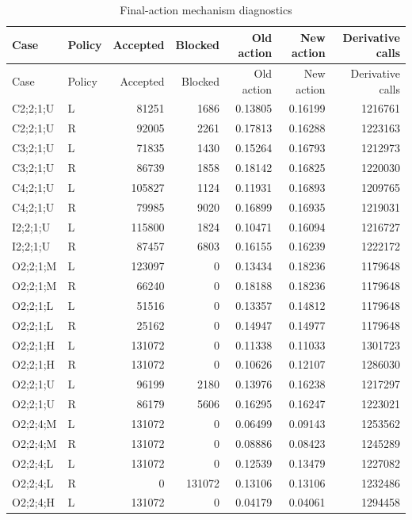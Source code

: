 {\small
\setlength{\tabcolsep}{3pt}
\begin{longtable}{@{}llrrrrr@{}}
\caption{Final-action mechanism diagnostics}\label{tab:mechanism50}\\
\toprule
Case & Policy & Accepted & Blocked & Old action & New action & Derivative calls \\
\midrule
\endfirsthead
\toprule
Case & Policy & Accepted & Blocked & Old action & New action & Derivative calls \\
\midrule
\endhead
\bottomrule
\endfoot
C2;2;1;U & L & 81251 & 1686 & 0.13805 & 0.16199 & 1216761 \\
C2;2;1;U & R & 92005 & 2261 & 0.17813 & 0.16288 & 1223163 \\
C3;2;1;U & L & 71835 & 1430 & 0.15264 & 0.16793 & 1212973 \\
C3;2;1;U & R & 86739 & 1858 & 0.18142 & 0.16825 & 1220030 \\
C4;2;1;U & L & 105827 & 1124 & 0.11931 & 0.16893 & 1209765 \\
C4;2;1;U & R & 79985 & 9020 & 0.16899 & 0.16935 & 1219031 \\
I2;2;1;U & L & 115800 & 1824 & 0.10471 & 0.16094 & 1216727 \\
I2;2;1;U & R & 87457 & 6803 & 0.16155 & 0.16239 & 1222172 \\
O2;2;1;M & L & 123097 & 0 & 0.13434 & 0.18236 & 1179648 \\
O2;2;1;M & R & 66240 & 0 & 0.18188 & 0.18236 & 1179648 \\
O2;2;1;L & L & 51516 & 0 & 0.13357 & 0.14812 & 1179648 \\
O2;2;1;L & R & 25162 & 0 & 0.14947 & 0.14977 & 1179648 \\
O2;2;1;H & L & 131072 & 0 & 0.11338 & 0.11033 & 1301723 \\
O2;2;1;H & R & 131072 & 0 & 0.10626 & 0.12107 & 1286030 \\
O2;2;1;U & L & 96199 & 2180 & 0.13976 & 0.16238 & 1217297 \\
O2;2;1;U & R & 86179 & 5606 & 0.16295 & 0.16247 & 1223021 \\
O2;2;4;M & L & 131072 & 0 & 0.06499 & 0.09143 & 1253562 \\
O2;2;4;M & R & 131072 & 0 & 0.08886 & 0.08423 & 1245289 \\
O2;2;4;L & L & 131072 & 0 & 0.12539 & 0.13479 & 1227082 \\
O2;2;4;L & R & 0 & 131072 & 0.13106 & 0.13106 & 1232486 \\
O2;2;4;H & L & 131072 & 0 & 0.04179 & 0.04061 & 1294458 \\

\end{longtable}}
